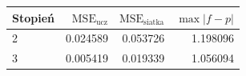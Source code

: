 \begin{tabular}{lrrr}
\toprule
Stopień & $\mathrm{MSE}_{\mathrm{ucz}}$ & $\mathrm{MSE}_{\mathrm{siatka}}$ & $\max|f-p|$ \\
\midrule
2 & \num{0.024589} & \num{0.053726} & \num{1.198096} \\
3 & \num{0.005419} & \num{0.019339} & \num{1.056094} \\
\bottomrule
\end{tabular}
